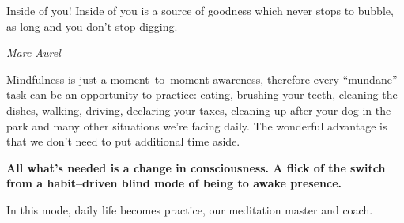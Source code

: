 \documentclass[../Book.Stress_regulation.tex]{subfiles}
\begin{document}
 \epigraph{Inside of you! Inside of you is a source of goodness which never stops to bubble, as long and you don't stop digging.}{\textit{Marc Aurel}}


Mindfulness is just a {moment--to--moment awareness}, therefore every ``mundane'' task can be an opportunity to practice: eating, brushing your teeth, cleaning the dishes, walking, driving, declaring your taxes, cleaning up after your dog in the park and many other situations we're facing daily.
The wonderful advantage is that we don't need to put additional time aside.


\textbf{All what's needed is a change in consciousness. A flick of the switch from a habit--driven blind  mode of being to {awake presence}.}

In this mode, daily {life becomes practice, our meditation master and coach}.





\end{document}
